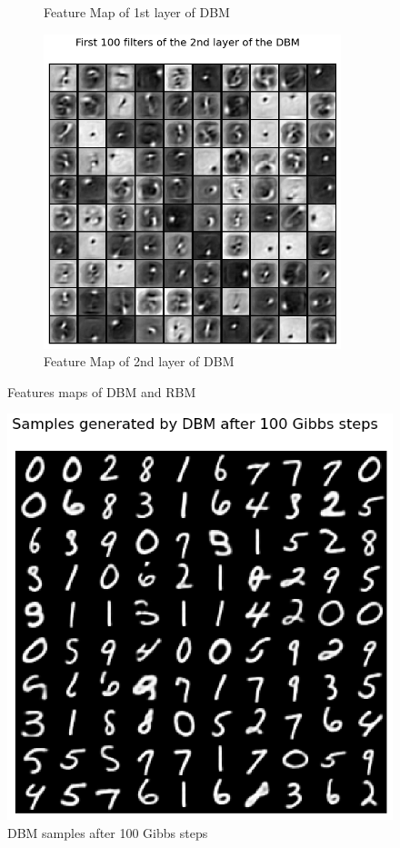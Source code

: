 \begin{figure}[ht]
\begin{subfigure}[b]{0.33\textwidth}
		\caption{Feature Map of 1st layer of DBM}\label{fig:dbm_features_1}
	\end{subfigure}%
	\begin{subfigure}[b]{0.33\textwidth}
		\includegraphics[height = 0.8\textwidth,width = 0.95\textwidth]{Exercise4/Report/dbm_feature_2}
		\caption{Feature Map of 2nd layer of DBM}\label{fig:dbm_features_2}
		\centering
		\captionsetup{width=0.9\linewidth, format = hang}
	\end{subfigure}
	\captionsetup{format = hang}
	\caption{Features maps of DBM and RBM}
	\label{fig:features}
\end{figure}
\begin{figure}
	\vspace*{-0.9cm}
	\captionsetup{format = hang}
	\includegraphics[height = 0.8\textwidth,width = 1\textwidth]{Exercise4/Report/dbm_output}
	\caption{DBM samples after 100 Gibbs steps}\label{fig:dbm}
\end{figure}%

